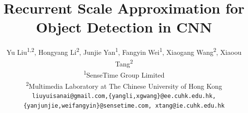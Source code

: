 \documentclass[10pt,twocolumn,letterpaper]{article}
\newcommand*{\affaddr}[1]{#1} %
\newcommand*{\affmark}[1][*]{\textsuperscript{#1}}
\newcommand*{\email}[1]{\texttt{#1}}
\begin{document}
\title{Recurrent Scale Approximation for Object Detection in CNN}


\author{%
Yu Liu\affmark[1,2], Hongyang Li\affmark[2], Junjie Yan\affmark[1], Fangyin Wei\affmark[1], Xiaogang Wang\affmark[2], Xiaoou Tang\affmark[2]\\
	\vspace{-.2cm}
\affaddr{\affmark[1]SenseTime Group Limited}\\
\affaddr{\affmark[2]Multimedia Laboratory at The Chinese University of Hong Kong}\\
\email{liuyuisanai@gmail.com,\{yangli,xgwang\}@ee.cuhk.edu.hk, \{yanjunjie,weifangyin\}@sensetime.com, xtang@ie.cuhk.edu.hk}
}


\maketitle

\end{document}
